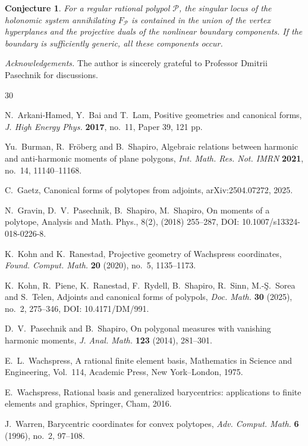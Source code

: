 \documentclass[10pt,a4paper,reqno]{amsart}
\newtheorem{conjecture}{Conjecture}
\newcommand {\cP} {\mathcal P}
\theoremstyle{plain}
\theoremstyle{definition}
\begin{document}
\begin{conjecture}\label{conj:singular-locus}
For a regular rational polypol $\cP$, the singular locus of the holonomic system
annihilating $F_{\cP}$ is contained in the union of the vertex hyperplanes and
the projective duals of the nonlinear boundary components.  If the boundary is
sufficiently generic, all these components occur.
\end{conjecture}

\noindent
\emph{Acknowledgements.} The author is sincerely grateful to Professor Dmitrii Pasechnik for discussions. 
  
\begin{thebibliography}{30}

 N.~Arkani-Hamed, Y.~Bai and T.~Lam, Positive geometries and canonical forms, \textit{J. High Energy Phys.} \textbf{2017}, no.~11, Paper 39, 121 pp.

 Yu.~Burman, R.~Fr\"oberg and B.~Shapiro, Algebraic relations between harmonic and anti-harmonic moments of plane polygons, \textit{Int. Math. Res. Not. IMRN} \textbf{2021}, no.~14, 11140--11168.

 C.~Gaetz, Canonical forms of polytopes from adjoints, arXiv:2504.07272, 2025.

 N.~Gravin, D.~V.~Pasechnik, B.~Shapiro, M.~Shapiro, On moments of a polytope, Analysis and Math. Phys., 8(2), (2018) 255--287, DOI: 10.1007/s13324-018-0226-8.


 K.~Kohn and K.~Ranestad, Projective geometry of Wachspress coordinates, \textit{Found. Comput. Math.} \textbf{20} (2020), no.~5, 1135--1173.

 K.~Kohn, R.~Piene, K.~Ranestad, F.~Rydell, B.~Shapiro, R.~Sinn, M.-\c{S}.~Sorea and S.~Telen, Adjoints and canonical forms of polypols, \textit{Doc. Math.} \textbf{30} (2025), no.~2, 275--346, DOI: 10.4171/DM/991.

 D.~V.~Pasechnik and B.~Shapiro, On polygonal measures with vanishing harmonic moments, \textit{J. Anal. Math.} \textbf{123} (2014), 281--301.


 E.~L.~Wachspress, A rational finite element basis, Mathematics in Science and Engineering, Vol.~114, Academic Press, New York--London, 1975.

 E.~Wachspress, Rational basis and generalized barycentrics: applications to finite elements and graphics, Springer, Cham, 2016.

 J.~Warren, Barycentric coordinates for convex polytopes, \textit{Adv. Comput. Math.} \textbf{6} (1996), no.~2, 97--108.

\end{thebibliography}
\end{document}

